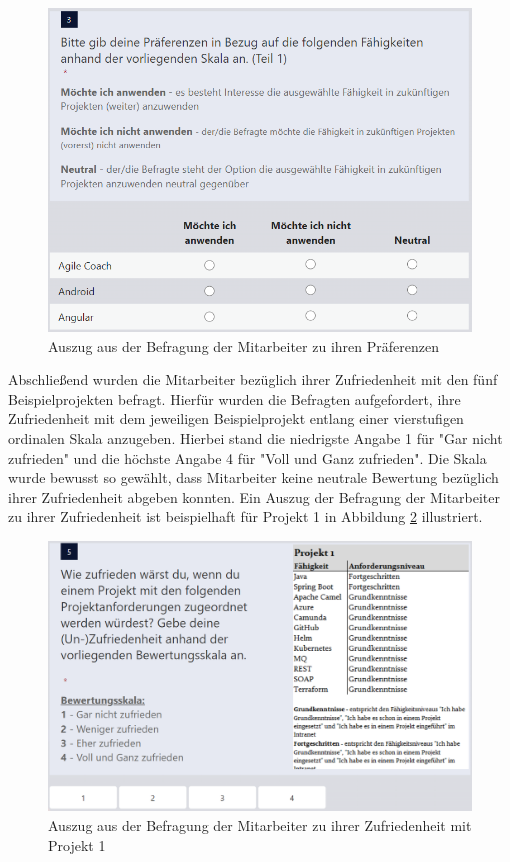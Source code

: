 \begin{figure}[H]
    \centering
	\includegraphics[width=1\textwidth]{gfx/befragung-praeferenzen.png}
	\caption[Auszug aus der Befragung der Mitarbeiter zu ihren Präferenzen]{Auszug aus der Befragung der Mitarbeiter zu ihren Präferenzen}
	\label{fig:methodik:abb4}
\end{figure}

Abschließend wurden die Mitarbeiter bezüglich ihrer Zufriedenheit mit den fünf Beispielprojekten befragt.
Hierfür wurden die Befragten aufgefordert, ihre Zufriedenheit mit dem jeweiligen Beispielprojekt entlang einer vierstufigen ordinalen Skala anzugeben.
Hierbei stand die niedrigste Angabe 1 für "Gar nicht zufrieden" und die höchste Angabe 4 für "Voll und Ganz zufrieden".
Die Skala wurde bewusst so gewählt, dass Mitarbeiter keine neutrale Bewertung bezüglich ihrer Zufriedenheit abgeben konnten.
Ein Auszug der Befragung der Mitarbeiter zu ihrer Zufriedenheit ist beispielhaft für Projekt 1 in Abbildung \ref{fig:methodik:abb5} illustriert.

\begin{figure}[H]
    \centering
	\includegraphics[width=1\textwidth]{gfx/befragung-zufriedenheit.png}
	\caption[Auszug aus der Befragung der Mitarbeiter zu ihrer Zufriedenheit mit Projekt 1]{Auszug aus der Befragung der Mitarbeiter zu ihrer Zufriedenheit mit Projekt 1}
	\label{fig:methodik:abb5}
\end{figure}

